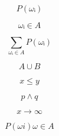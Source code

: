 \[
P(ωᵢ)
\]

\[
ωᵢ∈A
\]

\[
∑_{ωᵢ∈A} P(ωᵢ)
\]

\[
A∪B
\]

\[
x≤y
\]

\[
p∧q
\]

\[
x→∞
\]

\[
P(ωi) ω∈A
\]
